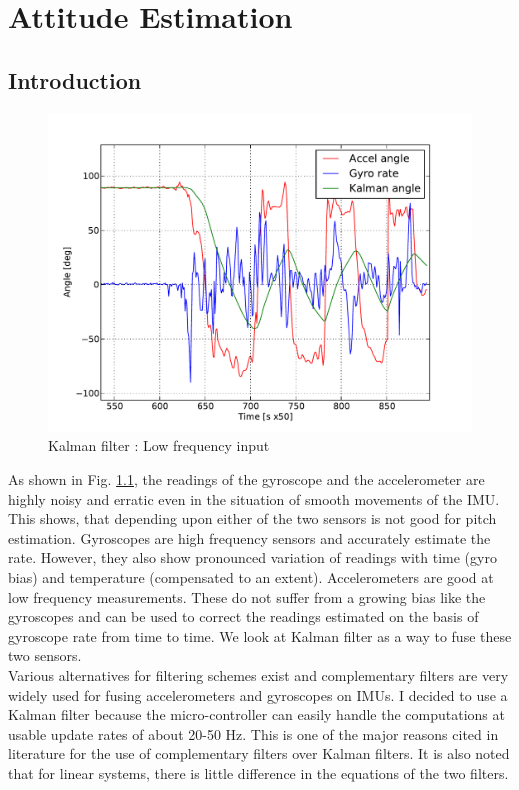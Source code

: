 \chapter{Attitude Estimation}
\label{chap:kf}

\section{Introduction}
\begin{figure}[!h]
\centering
\includegraphics[scale=0.8]{fig/kalman_lowfreq.pdf}
\caption{Kalman filter : Low frequency input}
\label{fig:5_kalman_lowfreq}
\end{figure}
As shown in Fig. \ref{fig:5_kalman_lowfreq}, the readings of the gyroscope and the accelerometer
are highly noisy and erratic even in the situation of smooth movements of the IMU. This shows,
that depending upon either of the two sensors is not good for pitch estimation. Gyroscopes are
high frequency sensors and accurately estimate the rate. However, they also show pronounced
variation of readings with time (gyro bias) and temperature (compensated to an extent). 
Accelerometers are good at low frequency measurements. These do not suffer from a growing
bias like the gyroscopes and can be used to correct the readings estimated on the basis of
gyroscope rate from time to time. We look at Kalman filter as a way to fuse these two sensors.\\

Various alternatives for filtering schemes exist and complementary filters are very widely used
for fusing accelerometers and gyroscopes on IMUs. I decided to use a Kalman filter because
the micro-controller can easily handle the computations at usable update rates of about
20-50 Hz. This is one of the major reasons cited in literature for the use of complementary
filters over Kalman filters. It is also noted that for linear systems, there is little difference in the equations of the two filters.\\

